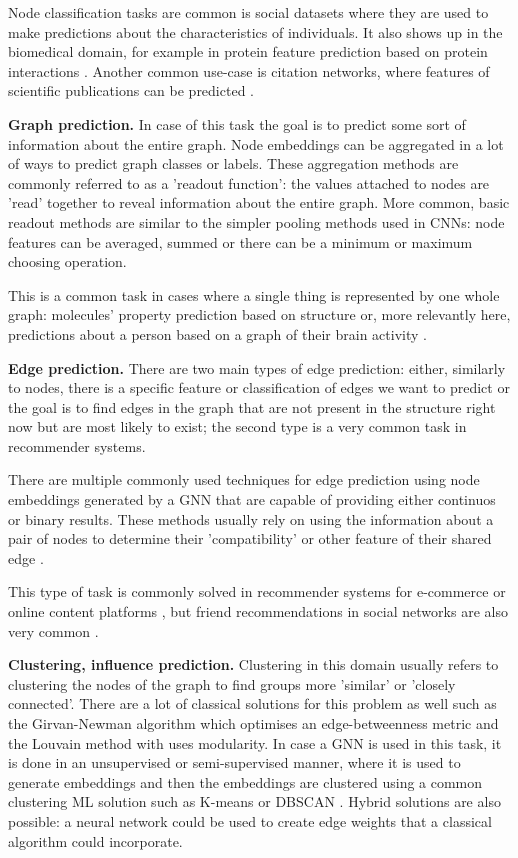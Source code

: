 	Node classification tasks are common is social datasets where they are used to make predictions about the characteristics of individuals. It also shows up in the biomedical domain, for example in protein feature prediction based on protein interactions \cite{xu2024graph}. Another common use-case is citation networks, where features of scientific publications can be predicted \cite{liu2022deep}.
	
	\textbf{Graph prediction.} In case of this task the goal is to predict some sort of information about the entire graph. Node embeddings can be aggregated in a lot of ways to predict graph classes or labels. These aggregation methods are commonly referred to as a 'readout function': the values attached to nodes are 'read' together to reveal information about the entire graph. More common, basic readout methods are similar to the simpler pooling methods used in CNNs: node features can be averaged, summed or there can be a minimum or maximum choosing operation. 
	
	This is a common task in cases where a single thing is represented by one whole graph: molecules' property prediction based on structure \cite{wieder2020compact} or, more relevantly here, predictions about a person based on a graph of their brain activity \cite{wang2021graph, li2021braingnn}.
	
	\textbf{Edge prediction.} There are two main types of edge prediction: either, similarly to nodes, there is a specific feature or classification of edges we want to predict or the goal is to find edges in the graph that are not present in the structure right now but are most likely to exist; the second type is a very common task in recommender systems.
	
	There are multiple commonly used techniques for edge prediction using node embeddings generated by a GNN that are capable of providing either continuos or binary results. These methods usually rely on using the information about a pair of nodes to determine their 'compatibility' or other feature of their shared edge \cite{li2023evaluating}.
	
	This type of task is commonly solved in recommender systems for e-commerce or online content platforms \cite{wu2022graph}, but friend recommendations in social networks are also very common \cite{fan2019graph}. 
	
	\textbf{Clustering, influence prediction.} Clustering in this domain usually refers to clustering the nodes of the graph to find groups more 'similar' or 'closely connected'. There are a lot of classical solutions for this problem as well such as the Girvan-Newman algorithm \cite{newman2004finding} which optimises an edge-betweenness metric and the Louvain method \cite{blondel2008fast} with uses modularity. In case a GNN is used in this task, it is done in an unsupervised or semi-supervised manner, where it is used to generate embeddings and then the embeddings are clustered using a common clustering ML solution such as K-means or DBSCAN \cite{ester1996density}. Hybrid solutions are also possible: a neural network could be used to create edge weights that a classical algorithm could incorporate.
	
